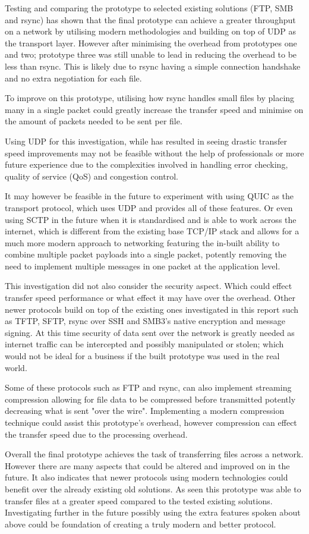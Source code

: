 Testing and comparing the prototype to selected existing solutions (FTP, SMB and rsync) has shown that the final prototype can achieve a greater throughput on a network by utilising modern methodologies and building on top of UDP as the transport layer. However after minimising the overhead from prototypes one and two; prototype three was still unable to lead in reducing the overhead to be less than rsync. This is likely due to rsync having a simple connection handshake and no extra negotiation for each file.

To improve on this prototype, utilising how rsync handles small files by placing many in a single packet could greatly increase the transfer speed and minimise on the amount of packets needed to be sent per file.

Using UDP for this investigation, while has resulted in seeing drastic transfer speed improvements may not be feasible without the help of professionals or more future experience due to the complexities involved in handling error checking, quality of service (QoS) and congestion control.

It may however be feasible in the future to experiment with using QUIC as the transport protocol, which uses UDP and provides all of these features. Or even using SCTP in the future when it is standardised and is able to work across the internet, which is different from the existing base TCP/IP stack and allows for a much more modern approach to networking featuring the in-built ability to combine multiple packet payloads into a single packet, potently removing the need to implement multiple messages in one packet at the application level.

This investigation did not also consider the security aspect. Which could effect transfer speed performance or what effect it may have over the overhead. Other newer protocols build on top of the existing ones investigated in this report such as TFTP, SFTP, rsync over SSH and SMB3's native encryption and message signing. At this time security of data sent over the network is greatly needed as internet traffic can be intercepted and possibly manipulated or stolen; which would not be ideal for a business if the built prototype was used in the real world.

Some of these protocols such as FTP and rsync, can also implement streaming compression allowing for file data to be compressed before transmitted potently decreasing what is sent "over the wire". Implementing a modern compression technique could assist this prototype's overhead, however compression can effect the transfer speed due to the processing overhead.

Overall the final prototype achieves the task of transferring files across a network. However there are many aspects that could be altered and improved on in the future. It also indicates that newer protocols using modern technologies could benefit over the already existing old solutions. As seen this prototype was able to transfer files at a greater speed compared to the tested existing solutions. Investigating further in the future possibly using the extra features spoken about above could be foundation of creating a truly modern and better protocol.
